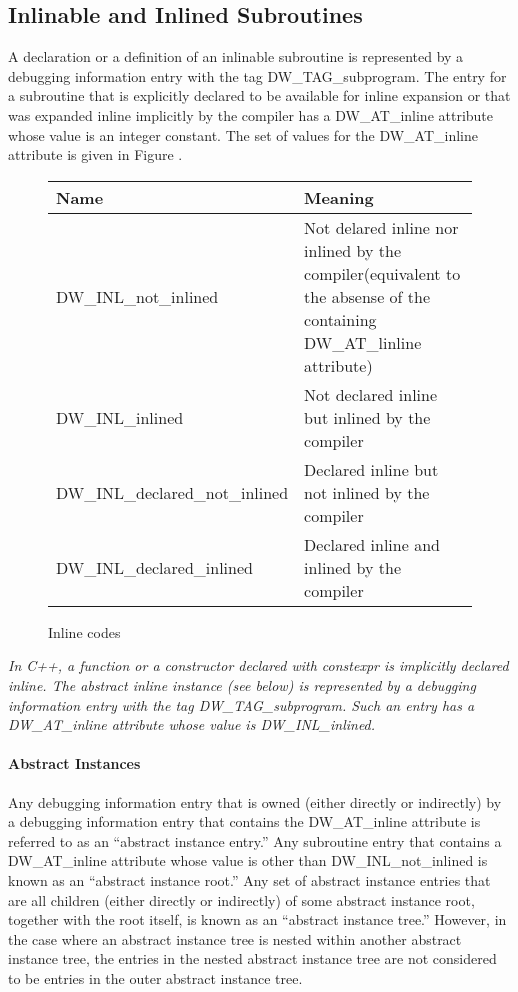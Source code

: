 \subsection{Inlinable and Inlined Subroutines}
A declaration or a definition of an inlinable subroutine
is represented by a debugging information entry with the
tag DW\_TAG\_subprogram. The entry for a subroutine that is
explicitly declared to be available for inline expansion or
that was expanded inline implicitly by the compiler has a
DW\_AT\_inline attribute whose value is an integer constant. The
set of values for the DW\_AT\_inline attribute is given in
Figure .

\begin{figure}[here]
\centering
\caption{Inline codes}
\label{fig:inlinecodes}
\begin{tabular}{lp{9cm}}
Name&Meaning\\ \hline
DW\_INL\_not\_inlined & Not delared inline nor inlined by the
  compiler(equivalent to the absense of the containing
  DW\-\_AT\-\_linline attribute) \\
DW\_INL\_inlined & Not declared inline but inlined by the compiler \\
DW\_INL\_declared\_not\_inlined & Declared inline but 
  not inlined by the compiler \\
DW\_INL\_declared\_inlined & Declared inline and inlined by the compiler \\
\end{tabular}
\end{figure}

\textit{In C++, a function or a constructor declared with
constexpr is implicitly declared inline. The abstract inline
instance (see below) is represented by a debugging information
entry with the tag DW\_TAG\_subprogram. Such an entry has a
DW\_AT\_inline attribute whose value is DW\_INL\_inlined.}


\paragraph{Abstract Instances}
\label{chap:abstractinstances}
Any debugging information entry that is owned (either
directly or indirectly) by a debugging information entry
that contains the DW\_AT\_inline attribute is referred to
as an “abstract instance entry.” Any subroutine entry
that contains a DW\_AT\_inline attribute whose value is other
than DW\_INL\_not\_inlined is known as an “abstract instance
root.” Any set of abstract instance entries that are all
children (either directly or indirectly) of some abstract
instance root, together with the root itself, is known as
an “abstract instance tree.” However, in the case where
an abstract instance tree is nested within another abstract
instance tree, the entries in the nested abstract instance
tree are not considered to be entries in the outer abstract
instance tree.

